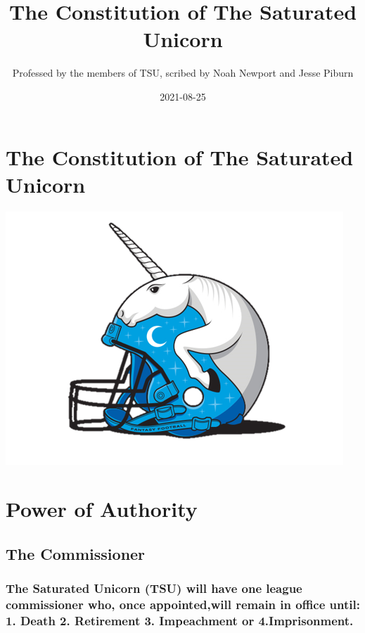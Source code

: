 \documentclass[
]{book}
\title{The Constitution of The Saturated Unicorn}
\author{Professed by the members of TSU, scribed by Noah Newport and Jesse Piburn}
\date{2021-08-25}
\begin{document}
\maketitle

{
\setcounter{tocdepth}{1}
\tableofcontents
}
\hypertarget{the-constitution-of-the-saturated-unicorn}{%
\chapter*{The Constitution of The Saturated Unicorn}\label{the-constitution-of-the-saturated-unicorn}}

\includegraphics[width=0.9\linewidth]{images/tsu-logo}

\hypertarget{power-of-authority}{%
\chapter{Power of Authority}\label{power-of-authority}}

\hypertarget{the-commissioner}{%
\section{The Commissioner}\label{the-commissioner}}

\hypertarget{the-saturated-unicorn-tsu-will-have-one-league-commissioner-who-once-appointedwill-remain-in-office-until-1.-death-2.-retirement-3.-impeachment-or-4.imprisonment.}{%
\subsection{The Saturated Unicorn (TSU) will have one league commissioner who, once appointed,will remain in office until: 1. Death 2. Retirement 3. Impeachment or 4.Imprisonment.}\label{the-saturated-unicorn-tsu-will-have-one-league-commissioner-who-once-appointedwill-remain-in-office-until-1.-death-2.-retirement-3.-impeachment-or-4.imprisonment.}}
\end{document}
